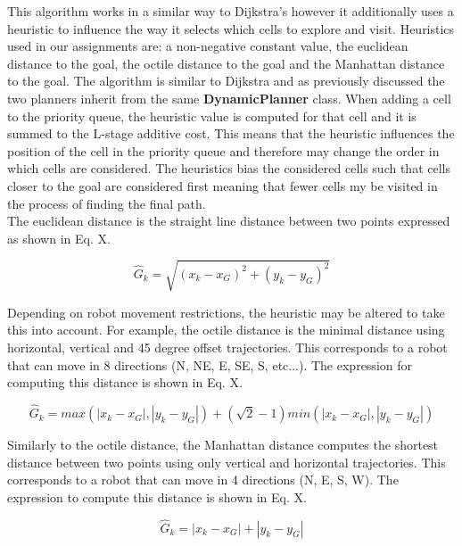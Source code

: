 \documentclass[a4paper,12pt]{article}
\begin{document}
				This algorithm works in a similar way to Dijkstra’s however it additionally uses a heuristic to influence the way it selects which cells to explore and visit. Heuristics used in our assignments are: a non-negative constant value, the euclidean distance to the goal, the octile distance to the goal and the Manhattan distance to the goal. The algorithm is similar to Dijkstra and as previously discussed the two planners inherit from the same \textbf{DynamicPlanner} class. When adding a cell to the priority queue, the heuristic value is computed for that cell and it is summed to the L-stage additive cost. This means that the heuristic influences the position of the cell in the priority queue and therefore may change the order in which cells are considered. The heuristics bias the considered cells such that cells closer to the goal are considered first meaning that fewer cells my be visited in the process of finding the final path.
				\\
				The euclidean distance is the straight line distance between two points expressed as shown in Eq. X. 
				
				\begin{equation}
					\hat{G}_{k} = \sqrt{(x_k-x_G)^2+(y_k-y_G)^2}
				\end{equation}
				
				Depending on robot movement restrictions, the heuristic may be altered to take this into account. For example, the octile distance is the minimal distance using horizontal, vertical and 45 degree offset trajectories. This corresponds to a robot that can move in 8 directions (N, NE, E, SE, S, etc...). The expression for computing this distance is shown in Eq. X.
				
				\begin{equation}
				\hat{G}_{k} = max(|x_k-x_G|,|y_k-y_G|) + (\sqrt{2}-1)min(|x_k-x_G|,|y_k-y_G|)
				\end{equation}
				
				Similarly to the octile distance, the Manhattan distance computes the shortest distance between two points using only vertical and horizontal trajectories. This corresponds to a robot that can move in 4 directions (N, E, S, W). The expression to compute this distance is shown in Eq. X. 
				
				\begin{equation}
				\hat{G}_{k} = |x_k-x_G|+|y_k-y_G|
				\end{equation}
				
\end{document}
